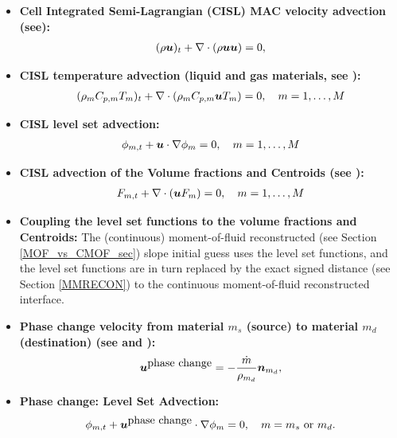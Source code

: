 \documentclass[]{article}
\newcommand{\bmu}{\mbox{\boldmath $u$\unboldmath}}
\newcommand{\bmn}{\mbox{\boldmath $n$\unboldmath}}
\begin{document}
\begin{itemize}
\item \textbf{Cell Integrated Semi-Lagrangian (CISL) MAC velocity advection
  (see\cite{pei2019hierarchical}):}
  \begin{eqnarray}
  (\rho \bmu)_{t}+\nabla\cdot(\rho\bmu\bmu)=0, \label{advection}
  \end{eqnarray}
\item \textbf{CISL temperature advection
  (liquid and gas materials, see \cite{VAHAB2021}):}
  \begin{eqnarray}
  (\rho_{m} C_{p,m} T_{m})_{t}+
  \nabla\cdot(\rho_{m} C_{p,m} \bmu T_{m})=0, \hspace{10pt}
  m=1,\ldots,M \label{adv2}
  \end{eqnarray}
\item \textbf{CISL level set advection:}
  \begin{eqnarray*}
  \phi_{m,t}+\bmu\cdot\nabla\phi_{m}=0, \hspace{10pt} 
  m=1,\ldots,M 
  \end{eqnarray*}
\item \textbf{CISL advection of the Volume fractions and Centroids
 (see \cite{jemison2013coupled,jemison2014compressible,li2015multiphase,pei2019hierarchical,VAHAB2021}):}
  \begin{eqnarray}
  F_{m,t}+\nabla\cdot(\bmu F_{m})=0, \hspace{10pt}
  m=1,\ldots,M  \label{eq:transport}
  \end{eqnarray}
\item \textbf{Coupling the level set functions to the volume fractions and Centroids:}
  The (continuous) 
  moment-of-fluid reconstructed
  (see Section \ref{MOF_vs_CMOF_sec}) 
  slope initial guess uses the level set functions,
  and the level set functions are in turn replaced by the exact 
  signed distance (see Section \ref{MMRECON}) 
  to the continuous moment-of-fluid reconstructed
  interface.
\item \textbf{Phase change velocity from material $m_{s}$ (source) to material $m_{d}$ (destination)
  (see \cite{VAHAB2021} and \cite{liu2022novel}):}
  \begin{eqnarray}
  \bmu^{\mbox{phase change}}=-\frac{\dot{m}}{\rho_{m_{d}}}\bmn_{m_{d}},
  \label{uphasechange}
  \end{eqnarray}
\item \textbf{Phase change: Level Set Advection:}
  \begin{eqnarray*}
  \phi_{m,t}+\bmu^{\mbox{phase change}}\cdot\nabla\phi_{m}=0,
  \hspace{10pt} m=m_{s} \mbox{ or } m_{d}.

\end{eqnarray*}
\end{itemize}
\end{document}
